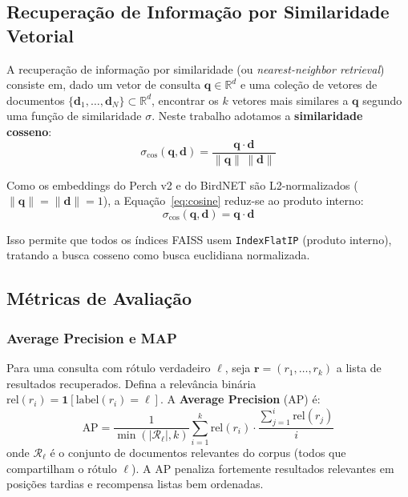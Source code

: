 \documentclass[12pt,a4paper]{article}
\begin{document}
\subsection{Recuperação de Informação por Similaridade Vetorial}

A recuperação de informação por similaridade (ou \emph{nearest-neighbor
retrieval}) consiste em, dado um vetor de consulta $\mathbf{q} \in \mathbb{R}^d$
e uma coleção de vetores de documentos $\{\mathbf{d}_1,\ldots,\mathbf{d}_N\}
\subset \mathbb{R}^d$, encontrar os $k$ vetores mais similares a $\mathbf{q}$
segundo uma função de similaridade $\sigma$. Neste trabalho adotamos a
\textbf{similaridade cosseno}:
\begin{equation}
  \sigma_{\cos}(\mathbf{q}, \mathbf{d}) =
  \frac{\mathbf{q} \cdot \mathbf{d}}{\|\mathbf{q}\|\,\|\mathbf{d}\|}
  \label{eq:cosine}
\end{equation}

Como os embeddings do Perch v2 e do BirdNET são L2-normalizados
($\|\mathbf{q}\| = \|\mathbf{d}\| = 1$), a Equação~\eqref{eq:cosine} reduz-se
ao produto interno:
\begin{equation}
  \sigma_{\cos}(\mathbf{q}, \mathbf{d}) = \mathbf{q} \cdot \mathbf{d}
  \label{eq:inner}
\end{equation}

Isso permite que todos os índices FAISS usem \texttt{IndexFlatIP} (produto
interno), tratando a busca cosseno como busca euclidiana normalizada.

\subsection{Métricas de Avaliação}

\subsubsection{Average Precision e MAP}

Para uma consulta com rótulo verdadeiro $\ell$, seja $\mathbf{r} =
(r_1,\ldots,r_k)$ a lista de resultados recuperados. Defina a relevância
binária $\text{rel}(r_i) = \mathbf{1}[\text{label}(r_i) = \ell]$. A
\textbf{Average Precision} (AP) é:
\begin{equation}
  \text{AP} =
  \frac{1}{\min(|\mathcal{R}_\ell|, k)}
  \sum_{i=1}^{k} \text{rel}(r_i) \cdot
  \frac{\sum_{j=1}^{i} \text{rel}(r_j)}{i}
  \label{eq:ap}
\end{equation}
onde $\mathcal{R}_\ell$ é o conjunto de documentos relevantes do corpus
(todos que compartilham o rótulo $\ell$). A AP penaliza fortemente resultados
relevantes em posições tardias e recompensa listas bem ordenadas.
\end{document}
